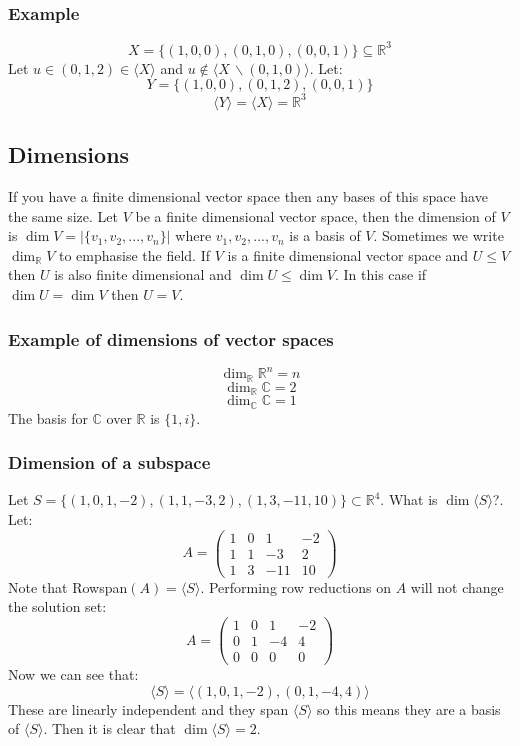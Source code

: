\documentclass[12pt]{article}
\begin{document}
\subsubsection*{Example}
\[X=\{(1,0,0),(0,1,0),(0,0,1)\}\subseteq\mathbb{R}^3\]
Let \(u\in (0,1,2)\in\langle X\rangle\) and \(u\notin \langle X\,\backslash(0,1,0)\rangle\). Let:
\[Y=\{(1,0,0),(0,1,2),(0,0,1)\}\]
\[\langle Y\rangle=\langle X\rangle =\mathbb{R}^3\]
\subsection*{Dimensions}
If you have a finite dimensional vector space then any bases of this space have the same size. Let \(V\) be a finite dimensional vector space, then the dimension of \(V\) is \(\dim{V}=|\{v_1,v_2,...,v_n\}|\) where \(v_1,v_2,...,v_n\) is a basis of \(V\). Sometimes we write \(\dim_\mathbb{R} V\) to emphasise the field. If \(V\) is a finite dimensional vector space and \(U\leqslant V\) then \(U\) is also finite dimensional and \(\dim{U}\leq \dim V\). In this case if \(\dim{U}=\dim{V}\) then \(U=V\).
\subsubsection*{Example of dimensions of vector spaces}
\[\dim_{\mathbb{R}}\mathbb{R}^n=n\]
\[\dim_{\mathbb{R}}\mathbb{C}=2\]
\[\dim_{\mathbb{C}}\mathbb{C}=1\]
The basis for \(\mathbb{C}\) over \(\mathbb{R}\) is \(\{1,i\}\).
\subsubsection*{Dimension of a subspace}
Let \(S=\{(1,0,1,-2),(1,1,-3,2),(1,3,-11,10)\}\subset \mathbb{R}^4\). What is \(\dim \langle S \rangle\)?. Let:
\[A=\begin{pmatrix}
    1 & 0 & 1 & -2 \\
    1 & 1 & -3 & 2 \\
    1 & 3 & -11 & 10
\end{pmatrix}\]
Note that Rowspan\((A)=\langle S\rangle\). Performing row reductions on \(A\) will not change the solution set:
\[A=\begin{pmatrix}
    1 & 0 & 1 & -2 \\
    0 & 1 & -4 & 4 \\
    0 & 0 & 0 & 0
\end{pmatrix}\]
Now we can see that:
\[\langle S\rangle = \langle (1,0,1,-2),(0,1,-4,4)\rangle\]
These are linearly independent and they span \(\langle S\rangle\) so this means they are a basis of \(\langle S\rangle\). Then it is clear that \(\dim{\langle S\rangle =2}\).
\end{document}
